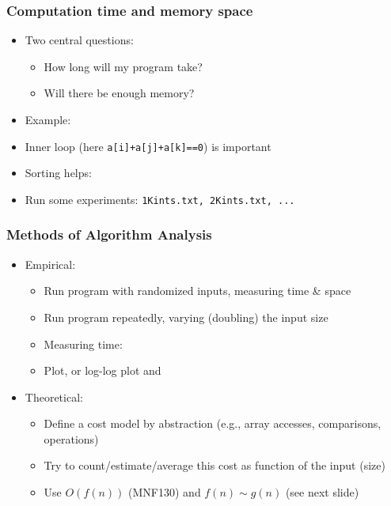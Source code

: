 \documentclass[handout]{beamer}
\newcommand{\git}{https://github.com/marcbezem/INF102/blob/master}
\begin{document}
\frame
  {
    
    \frametitle{Computation time and memory space}

\begin{itemize}[<+->]
\item Two central questions:
  \begin{itemize}
  \item How long will my program take?
  \item Will there be enough memory?
  \end{itemize}
\item Example: 
\href{http://algs4.cs.princeton.edu/14analysis/ThreeSum.java.html}%
{\color{red}{ThreeSum.java}}
\item Inner loop (here {\tt a[i]+a[j]+a[k]==0}) is important
\item Sorting helps: \href{\git/programs/oddsAndEnds/ThreeSumOptimized.java}%
{\color{red}{ThreeSumOptimized.java}}
\item Run some experiments: {\tt 1Kints.txt, 2Kints.txt, ...}
\end{itemize}  
}

\frame
  {
    
    \frametitle{Methods of Algorithm Analysis}

\begin{itemize}[<+->]

\item Empirical:
  \begin{itemize}
  \item Run program with randomized inputs, measuring time \& space
  \item Run program repeatedly, varying (doubling) the input size
  \item Measuring time: \href{http://algs4.cs.princeton.edu/code/javadoc/edu/princeton/cs/algs4/Stopwatch.html}%
  {\color{red}{StopWatch}}
  \item Plot, or log-log plot and 
\href{http://www.alcula.com/calculators/statistics/linear-regression/}{\color{red}{linear regression}}  
  \end{itemize}
\item Theoretical:
  \begin{itemize}
  \item Define a cost model by abstraction (e.g., array accesses, comparisons, operations)
  \item Try to count/estimate/average this cost as function of the input (size)
  \item Use $O(f(n))$ (MNF130) and $f(n)\sim g(n)$ (see next slide)
  \end{itemize}
\end{itemize}  
}
\end{document}
